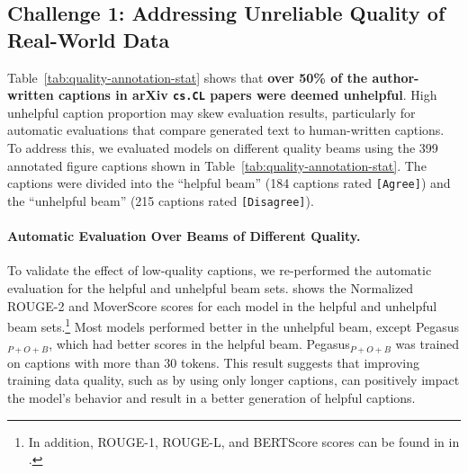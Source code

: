 \subsection{Challenge 1: Addressing Unreliable Quality of Real-World Data\label{sec:analysis-challenge-1}}


Table~\ref{tab:quality-annotation-stat} shows that \textbf{over 50\% of the author-written captions in arXiv \texttt{cs.CL} papers were deemed unhelpful}.
High unhelpful caption proportion %
may skew evaluation results, particularly for automatic evaluations that compare generated text to human-written captions.
To address this, we evaluated models on different quality beams using the 399 annotated figure captions shown in Table~\ref{tab:quality-annotation-stat}.
The captions were divided into the ``helpful beam'' (184 captions rated \texttt{[Agree]}) and the ``unhelpful beam'' (215 captions rated \texttt{[Disagree]}).

\paragraph{Automatic Evaluation Over Beams of Different Quality.\label{sec:auto-eval-quality-beam}}
To validate the effect of low-quality captions, we re-performed the automatic evaluation for the helpful and unhelpful beam sets.
 shows the Normalized ROUGE-2 and MoverScore scores for each model in the helpful and unhelpful beam sets.\footnote{In addition, ROUGE-1, ROUGE-L, and BERTScore scores can be found in  in .}
Most models performed better in the unhelpful beam, except Pegasus$_{P+O+B}$, which had better scores in the helpful beam.
Pegasus$_{P+O+B}$ was trained on captions with more than 30 tokens.
This result suggests that improving training data quality, such as by using only longer captions, can positively impact the model's behavior and result in a better generation of helpful captions.



